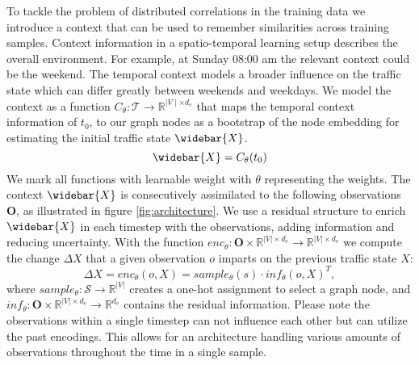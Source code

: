 To tackle the problem of distributed correlations in the training data we introduce a context that can be used to remember similarities across training samples.
Context information in a spatio-temporal learning setup describes the overall environment.
For example, at Sunday 08:00 am the relevant context could be the weekend.
The temporal context models a broader influence on the traffic state which can differ greatly between weekends and weekdays.
We model the context as a function $C_{\theta}: \mathcal{T} \to \mathbb{R}^{\mid V \mid \times d_e}$ that maps the temporal context information of $t_0$, to our graph nodes as a bootstrap of the node embedding for estimating the initial traffic state $\widebar{X}$.
\begin{equation}
    \widebar{X} = C_{\theta}(t_0)
    \label{eq:mean_state}
\end{equation}
We mark all functions with learnable weight with $\theta$ representing the weights.
The context $\widebar{X}$ is consecutively assimilated to the following observations $\mathbf{O}$, as illustrated in figure \ref{fig:architecture}.
We use a residual structure to enrich $\widebar{X}$ in each timestep with the observations, adding information and reducing uncertainty.
With the function $enc_{\theta}: \mathbf{O} \times \mathbb{R}^{|V| \times d_e} \to \mathbb{R}^{|V| \times d_e}$ we compute the change $\Delta X$ that a given observation $o$ imparts on the previous traffic state $X$:
\begin{equation}
    \Delta X = enc_{\theta}(o, X) = sample_{\theta}(s) \cdot inf_{\theta}(o, X)^T,
\end{equation}
where $sample_{\theta}: \mathcal{S} \to \mathbb{R}^{|V|}$ creates a one-hot assignment to select a graph node, and $inf_{\theta}: \mathbf{O} \times \mathbb{R}^{|V| \times d_e} \to \mathbb{R}^{d_e}$ contains the residual information.
Please note the observations within a single timestep can not influence each other but can utilize the past encodings.
This allows for an architecture handling various amounts of observations throughout the time in a single sample.


